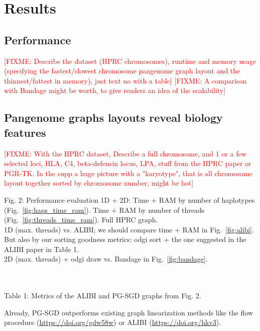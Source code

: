 \documentclass{bioinfo}
\theoremstyle{definition}
\newcommand{\red}[1]{{\textcolor{Red}{#1}}}
\newcommand{\FIXME}[1]{\red{[FIXME: #1]}}
\begin{document}
    
    \fi

    \section{Results}
    \label{sec:results}

    \subsection{Performance}
	\FIXME{Describe the dataset (HPRC chromosomes), runtime and memory usage (specifying the fastest/slowest chromosome pangenome graph layout and the thinnest/fattest in memory), just text no with a table}
    \FIXME{A comparison with Bandage might be worth, to give readers an idea of the scalability}
	

    \subsection{Pangenome graphs layouts reveal biology features}
	\FIXME{With the HPRC dataset, Describe a full chromosome, and 1 or a few selected loci, HLA, C4, beta-defensin locus, LPA, stuff from the HPRC paper or PGR-TK.
	In the supp a huge picture with a "karyotype", that is all chromosome layout together sorted by chromosome number, might be hot}

	\iffalse
	Fig. 2: Performance evaluation 1D + 2D: Time + RAM by number of haplotypes (Fig.~\ref{fig:haps_time_ram}). Time + RAM by number of threads (Fig.~\ref{fig:threads_time_ram}). Full HPRC graph.
    \\
    1D (max. threads) vs. ALIBI; we should compare time + RAM in Fig.~\ref{fig:alibi}.
    But also by our sorting goodness metrics: odgi sort + the one suggested in the ALIBI paper in Table 1.
    \\
    2D (max. threads) + odgi draw vs. Bandage in Fig.~\ref{fig:bandage}.
    
    \\
    \\
    Table 1: Metrics of the ALIBI and PG-SGD graphs from Fig. 2.
    
    Already, PG-SGD outperforms existing graph linearization methods like the flow procedure (\url{https://doi.org/gdw58w}) or ALIBI (\url{https://doi.org/hkv3}).
\end{document}

